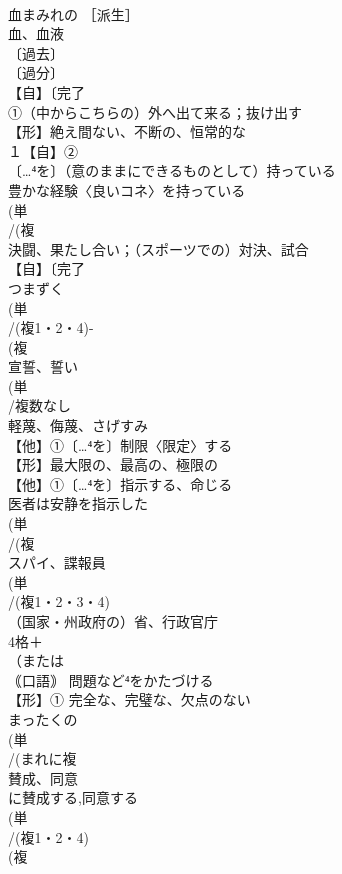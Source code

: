 \documentclass[8pt]{extreport}
\begin{document}
\begin{CJK}{UTF8}{min}
\\	血まみれの ［派生］ 
\\	血、血液
\\	〔過去〕
\\	〔過分〕
\\	【自】〔完了
\\	①（中からこちらの）外へ出て来る；抜け出す 
\\	【形】絶え間ない、不断の、恒常的な
\\	１【自】②
\\	〔…⁴を〕（意のままにできるものとして）持っている 
\\	豊かな経験〈良いコネ〉を持っている
\\	(単
\\	/(複
\\	決闘、果たし合い；（スポーツでの）対決、試合 
\\	【自】〔完了
\\	つまずく 
\\	(単
\\	/(複1・2・4)-
\\	(複
\\	宣誓、誓い 
\\	(単
\\	/複数なし 
\\	軽蔑、侮蔑、さげすみ 
\\	【他】①〔…⁴を〕制限〈限定〉する 
\\	【形】最大限の、最高の、極限の 
\\	【他】①〔…⁴を〕指示する、命じる 
\\	医者は安静を指示した
\\	(単
\\	/(複
\\	スパイ、諜報員 
\\	(単
\\	/(複1・2・3・4)
\\	（国家・州政府の）省、行政官庁 
\\	4格＋
\\	（または
\\	｟口語｠ 問題など⁴をかたづける
\\	【形】① 完全な、完璧な、欠点のない 
\\	まったくの
\\	(単
\\	/(まれに複
\\	賛成、同意 
\\	に賛成する,同意する
\\	(単
\\	/(複1・2・4)
\\	(複

\end{CJK}
\end{document}
